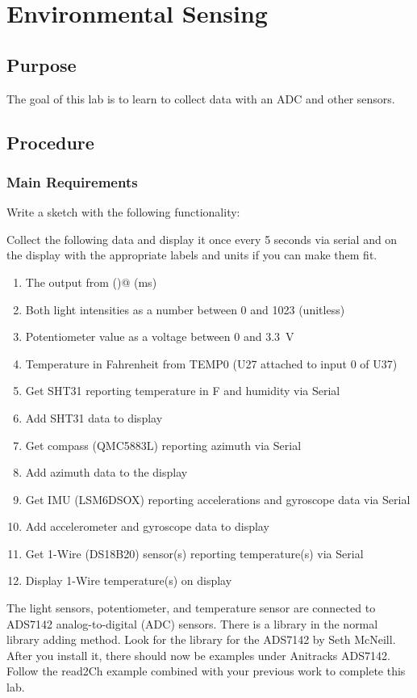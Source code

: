 \chapter{Environmental Sensing}

\section{Purpose}
The goal of this lab is to learn to collect data with an ADC and other sensors.

\section{Procedure}
\subsection{Main Requirements}
Write a sketch with the following functionality:

Collect the following data and display it once every 5 seconds via serial and on the display with the 
appropriate labels and units if you can make them fit.
\begin{enumerate}
	\item The output from \lstinline@millis()@ (ms)
	\item Both light intensities as a number between 0 and 1023 (unitless)
	\item Potentiometer value as a voltage between 0 and 3.3~V
	\item Temperature in Fahrenheit from TEMP0 (U27 attached to input 0 of U37)
    \item Get SHT31 reporting temperature in F and humidity via Serial
    \item Add SHT31 data to display 
    \item Get compass (QMC5883L) reporting azimuth via Serial
    \item Add azimuth data to the display
    \item Get IMU (LSM6DSOX) reporting accelerations and gyroscope data via Serial 
    \item Add accelerometer and gyroscope data to display
    \item Get 1-Wire (DS18B20) sensor(s) reporting temperature(s) via Serial
    \item Display 1-Wire temperature(s) on display
\end{enumerate}

The light sensors, potentiometer, and temperature sensor are connected to ADS7142 
analog-to-digital (ADC) sensors. There is a library in the normal library adding 
method. Look for the library for the ADS7142 by Seth McNeill. After you install it,
there should now be examples under Anitracks ADS7142. Follow the read2Ch example 
combined with your previous work to complete this lab.

